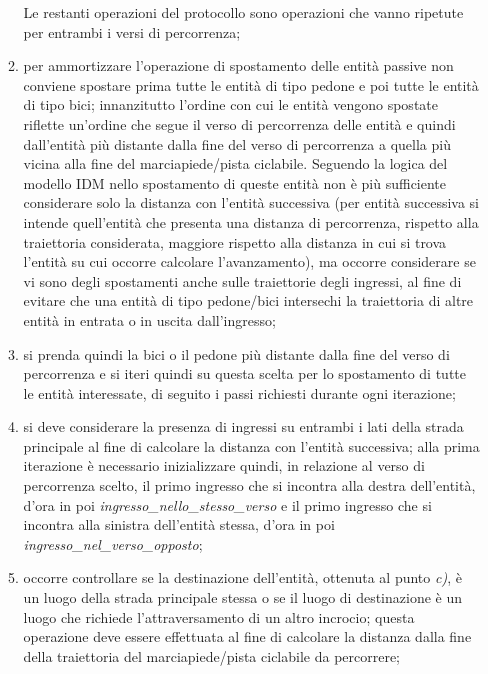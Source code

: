 \begin{enumerate}
\begin{enumerate}
Le restanti operazioni del protocollo sono operazioni che vanno ripetute per entrambi i versi di percorrenza;
\item per ammortizzare l'operazione di spostamento delle entità passive non conviene spostare prima tutte le entità di tipo pedone e poi tutte le entità di tipo bici; innanzitutto l'ordine con cui le entità vengono spostate riflette un'ordine che segue il verso di percorrenza delle entità e quindi dall'entità più distante dalla fine del verso di percorrenza a quella più vicina alla fine del marciapiede/pista ciclabile. Seguendo la logica del modello \ac{IDM} nello spostamento di queste entità non è più sufficiente considerare solo la distanza con l'entità successiva (per entità successiva si intende quell'entità che presenta una distanza di percorrenza, rispetto alla traiettoria considerata, maggiore rispetto alla distanza in cui si trova l'entità su cui occorre calcolare l'avanzamento), ma occorre considerare se vi sono degli spostamenti anche sulle traiettorie degli ingressi, al fine di evitare che una entità di tipo pedone/bici intersechi la traiettoria di altre entità in entrata o in uscita dall'ingresso;
\item si prenda quindi la bici o il pedone più distante dalla fine del verso di percorrenza e si iteri quindi su questa scelta per lo spostamento di tutte le entità interessate, di seguito i passi richiesti durante ogni iterazione;
\item si deve considerare la presenza di ingressi su entrambi i lati della strada principale al fine di calcolare la distanza con l'entità successiva; alla prima iterazione è necessario inizializzare quindi, in relazione al verso di percorrenza scelto, il primo ingresso che si incontra alla destra dell'entità, d'ora in poi \textit{ingres\-so\_nel\-lo\_stes\-so\_ver\-so} e il primo ingresso che si incontra alla sinistra dell'entità stessa, d'ora in poi \textit{ingres\-so\_nel\_ver\-so\_op\-pos\-to};   
\item occorre controllare se la destinazione dell'entità, ottenuta al punto \textit{c)}, è un luogo della strada principale stessa o se il luogo di destinazione è un luogo che richiede l'attraversamento di un altro incrocio; questa operazione deve essere effettuata al fine di calcolare la distanza dalla fine della traiettoria del marciapiede/pista ciclabile da percorrere;

\end{enumerate}
\end{enumerate}
